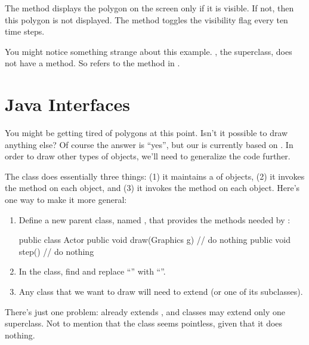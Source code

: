 The  method displays the polygon on the screen only if it is visible.
If not, then this polygon is not displayed.
The  method toggles the visibility flag every ten time steps.

You might notice something strange about this example.
, the superclass, does not have a  method.
So  refers to the  method in .



\section{Java Interfaces}

You might be getting tired of polygons at this point.
Isn't it possible to draw anything else?
Of course the answer is ``yes'', but our  is currently based on .
In order to draw other types of objects, we'll need to generalize the code further.

The  class does essentially three things: (1) it maintains a  of objects, (2) it invokes the  method on each object, and (3) it invokes the  method on each object.
Here's one way to make it more general:

\begin{enumerate}

\item
Define a new parent class, named , that provides the methods needed by :

\begin{code}
public class Actor {
    public void draw(Graphics g) {
        // do nothing
    }
    public void step() {
        // do nothing
    }
}
\end{code}

\item
In the  class, find and replace ``'' with ``''.

\item
Any class that we want to draw will need to extend  (or one of its subclasses).

\end{enumerate}

There's just one problem:  already extends , and classes may extend only one superclass.
Not to mention that the  class seems pointless, given that it does nothing.

